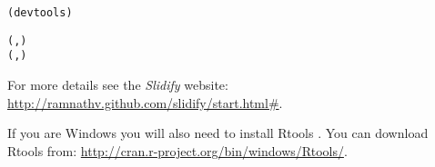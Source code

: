 \begin{knitrout}
\color{fgcolor}\begin{kframe}
\begin{alltt}
(devtools)

(, )
(, )
\end{alltt}
\end{kframe}
\end{knitrout}


\noindent For more details see the \emph{Slidify} website: \url{http://ramnathv.github.com/slidify/start.html#}.

If you are Windows you will also need to install Rtools \cite[]{Rtools}. You can download Rtools from: \url{http://cran.r-project.org/bin/windows/Rtools/}.\label{RtoolsDownload}


